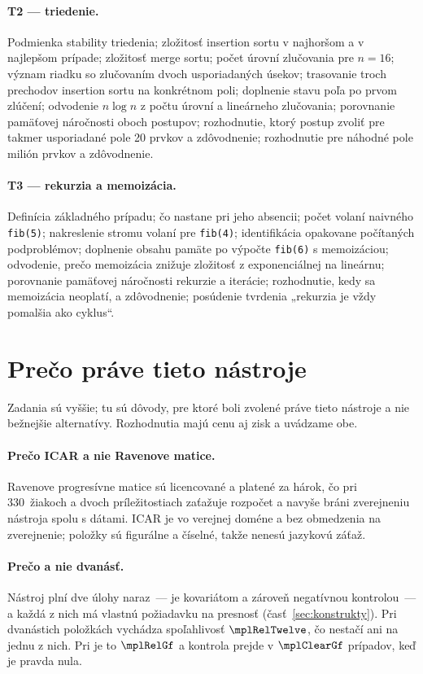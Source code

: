 \paragraph{T2 --- triedenie.} Podmienka stability triedenia; zložitosť insertion sortu v najhoršom a v najlepšom prípade; zložitosť merge sortu; počet úrovní zlučovania pre $n=16$; význam riadku so zlučovaním dvoch usporiadaných úsekov; trasovanie troch prechodov insertion sortu na konkrétnom poli; doplnenie stavu poľa po prvom zlúčení; odvodenie $n\log n$ z počtu úrovní a lineárneho zlučovania; porovnanie pamäťovej náročnosti oboch postupov; rozhodnutie, ktorý postup zvoliť pre takmer usporiadané pole 20 prvkov a zdôvodnenie; rozhodnutie pre náhodné pole milión prvkov a zdôvodnenie.

\paragraph{T3 --- rekurzia a memoizácia.} Definícia základného prípadu; čo nastane pri jeho absencii; počet volaní naivného \texttt{fib(5)}; nakreslenie stromu volaní pre \texttt{fib(4)}; identifikácia opakovane počítaných podproblémov; doplnenie obsahu pamäte po výpočte \texttt{fib(6)} s memoizáciou; odvodenie, prečo memoizácia znižuje zložitosť z exponenciálnej na lineárnu; porovnanie pamäťovej náročnosti rekurzie a iterácie; rozhodnutie, kedy sa memoizácia neoplatí, a zdôvodnenie; posúdenie tvrdenia „rekurzia je vždy pomalšia ako cyklus“.

\section{Prečo práve tieto nástroje}
\label{sec:volba-nastrojov}

Zadania sú vyššie; tu sú dôvody, pre ktoré boli zvolené práve tieto nástroje a
nie bežnejšie alternatívy. Rozhodnutia majú cenu aj zisk a uvádzame obe.

\paragraph{Prečo ICAR a nie Ravenove matice.} Ravenove progresívne matice sú licencované a platené za hárok, čo pri 330~žiakoch a dvoch príležitostiach zaťažuje rozpočet a navyše bráni zverejneniu nástroja spolu s dátami. ICAR je vo verejnej doméne a bez obmedzenia na zverejnenie; položky sú figurálne a číselné, takže nenesú jazykovú záťaž.

\paragraph{Prečo \mplGfItems{} a nie dvanásť.} Nástroj plní dve úlohy naraz~--- je kovariátom a zároveň negatívnou kontrolou~--- a každá z nich má vlastnú požiadavku na presnosť (časť~\ref{sec:konstrukty}). Pri dvanástich položkách vychádza spoľahlivosť $\mplRelTwelve$, čo nestačí ani na jednu z nich. Pri \mplGfItems{} je to $\mplRelGf$ a kontrola prejde v $\mplClearGf$ prípadov, keď je pravda nula.


